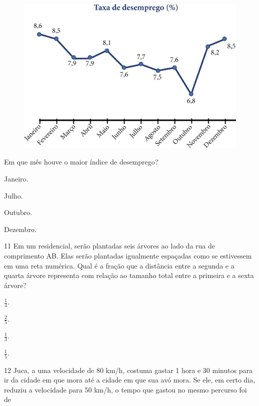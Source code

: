 \begin{figure}[htpb!]
\centering
\includegraphics[width=\textwidth]{media/image79.png}
\end{figure}

Em que mês houve o maior índice de desemprego?

\begin{multicols}{2}
\begin{escolha}
\item
  Janeiro.
\item
  Julho.
\item
  Outubro.
\item
  Dezembro.
\end{escolha}
\end{multicols}

\num{11} Em um residencial, serão plantadas seis árvores ao lado da rua de comprimento AB. Elas
serão plantadas igualmente espaçadas como se estivessem em uma reta numérica.
Qual é a fração que a distância entre a segunda e a quarta árvore
representa com relação ao tamanho total entre a primeira e a sexta árvore?

\begin{multicols}{2}
\begin{escolha}
\item
  $\frac{1}{4}$.
\item
  $\frac{2}{5}$.
\item
  $\frac{1}{3}$.
\item
  $\frac{1}{5}$.
\end{escolha}
\end{multicols}


\num{12} Juca, a uma velocidade de 80 km/h, costuma gastar 1 hora e 30 minutos
para ir da cidade em que mora até a cidade em que sua avó mora. Se ele,
em certo dia, reduziu a velocidade para 50 km/h, o tempo que gastou no mesmo percurso foi de


